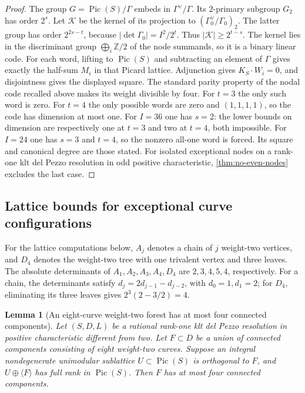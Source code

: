 \documentclass[11pt,reqno]{amsart}
\newtheorem{lemma}[lemma]{Lemma}
\theoremstyle{definition}
\theoremstyle{remark}
\DeclareMathOperator{\Pic}{Pic}
\newcommand{\ZZ}{\mathbb Z}
\numberwithin{equation}{section}
\begin{document}
\begin{proof}
The group $G=\Pic(S)/\Gamma$ embeds in $\Gamma^\vee/\Gamma$.
Its $2$-primary subgroup $G_2$ has order $2^s$.
Let $\mathcal K$ be the kernel of its projection to
$(\Gamma_0^\vee/\Gamma_0)_2$. The latter group has order
$2^{2s-t}$, because $|\det\Gamma_0|=I^2/2^t$.
Thus $|\mathcal K|\ge2^{t-s}$. The kernel lies in the discriminant group
$\bigoplus_i\ZZ/2$ of the node summands, so it is a binary linear code.
For each word, lifting to $\Pic(S)$ and subtracting an element of
$\Gamma$ gives exactly the half-sum $M_\epsilon$ in that Picard lattice.
Adjunction gives $K_S\cdot W_i=0$, and disjointness gives the displayed
square. The standard parity property of the nodal code recalled above
makes its weight divisible by four.
For $t=3$ the only such word is zero. For $t=4$ the only possible words
are zero and $(1,1,1,1)$, so the code has dimension at most one.
For $I=36$ one has $s=2$: the lower bounds on dimension are respectively
one at $t=3$ and two at $t=4$, both impossible.
For $I=24$ one has $s=3$ and $t=4$, so the nonzero all-one word is forced.
Its square and canonical degree are those stated. For isolated exceptional nodes on a rank-one klt del Pezzo resolution in odd positive
characteristic, \cref{thm:no-even-nodes} excludes the last case.
\end{proof}


\subsection{Lattice bounds for exceptional curve configurations}
For the lattice computations below, $A_j$ denotes a chain of $j$
weight-two vertices, and $D_4$ denotes the weight-two tree with one
trivalent vertex and three leaves. The absolute determinants of
$A_1,A_2,A_3,A_4,D_4$ are $2,3,4,5,4$, respectively. For a chain,
the determinants satisfy $d_j=2d_{j-1}-d_{j-2}$, with $d_0=1,d_1=2$;
for $D_4$, eliminating its three leaves gives $2^3(2-3/2)=4$.

\begin{lemma}[An eight-curve weight-two forest has at most four connected components]
\label{lem:eight-curve-forest}
Let $(S,D,L)$ be a rational rank-one klt del Pezzo resolution in
positive characteristic different from two. Let $F\subset D$ be a
union of connected components consisting of eight weight-two curves.
Suppose an integral nondegenerate unimodular sublattice
$U\subset\Pic(S)$ is orthogonal to $F$, and $U\oplus\langle F\rangle$
has full rank in $\Pic(S)$. Then $F$ has at most four connected
components.
\end{lemma}
\end{document}
